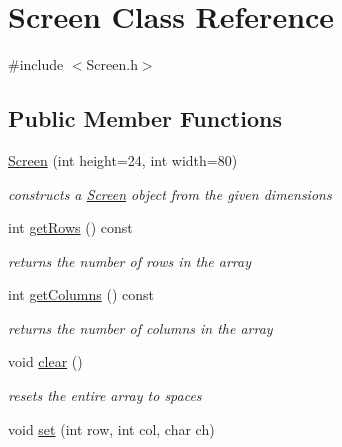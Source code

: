 \hypertarget{classScreen}{
\section{Screen Class Reference}
\label{classScreen}
}


{\ttfamily \#include $<$Screen.h$>$}\subsection*{Public Member Functions}
\begin{DoxyCompactItemize}
\item 
\hyperlink{classScreen_a44fc6e533a84e710467128a95f20462c}{Screen} (int height=24, int width=80)
\begin{DoxyCompactList}\small\item\em constructs a \hyperlink{classScreen}{Screen} object from the given dimensions \item\end{DoxyCompactList}\item 
int \hyperlink{classScreen_a2d1cf1b84a49135a33aac9d7dc41af3a}{getRows} () const 
\begin{DoxyCompactList}\small\item\em returns the number of rows in the array \item\end{DoxyCompactList}\item 
int \hyperlink{classScreen_ad910656f46d9b22295fb030b5e2aec3d}{getColumns} () const 
\begin{DoxyCompactList}\small\item\em returns the number of columns in the array \item\end{DoxyCompactList}\item 
\hypertarget{classScreen_a35e74266b2a04e37b354ceff7a5f1031}{
void \hyperlink{classScreen_a35e74266b2a04e37b354ceff7a5f1031}{clear} ()}
\label{classScreen_a35e74266b2a04e37b354ceff7a5f1031}

\begin{DoxyCompactList}\small\item\em resets the entire array to spaces \item\end{DoxyCompactList}\item 
void \hyperlink{classScreen_ae19cdc0fab2d48c6bc947a78bb77b50a}{set} (int row, int col, char ch)
\end{DoxyCompactItemize}
